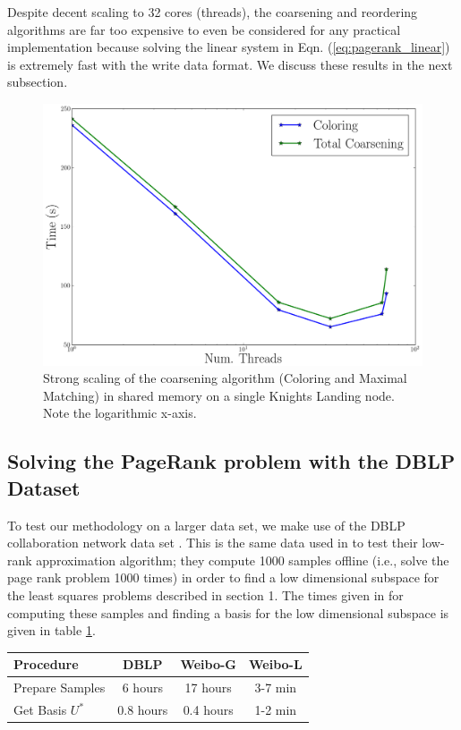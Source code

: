 \documentclass[11pt]{article}
\begin{document}
Despite decent scaling to 32 cores (threads), the coarsening and reordering
algorithms are far
too expensive to even be considered for any practical implementation because
solving the linear system in Eqn. (\ref{eq:pagerank_linear}) is extremely fast
with the write data format. We discuss these results in the next subsection.

\begin{figure}
\centering
\includegraphics[width=.5\linewidth]{figs/color_timing.png}
\caption{Strong scaling of the coarsening algorithm (Coloring and Maximal
Matching) in shared memory on a single Knights Landing node. Note the
logarithmic x-axis.}
\label{fig:color_time}
\end{figure}


\subsection{Solving the PageRank problem with the DBLP Dataset}

To test our methodology on a larger data set, we make use of the DBLP
collaboration network data set \cite{snapnets,dblp}. This is the same data used
in \cite{xie} to test their low-rank approximation algorithm; they compute 1000
samples offline (i.e., solve the page rank problem 1000 times) in order to find a
low dimensional subspace for the least squares problems described in section 1.
The times given in \cite{xie} for
computing these samples and finding a basis for the low dimensional subspace 
is given in table \ref{tab:time}.

\begin{table}[h!]
	\centering 
{}
   \begin{tabular}[h]{|l|c|c|c|}
	   \hline 
	   \textbf{Procedure} & \textbf{DBLP} & \textbf{Weibo-G} &
	   \textbf{Weibo-L} \\
	   \hline
	   Prepare Samples & 6 hours & 17 hours & 3-7 min \\ 
	   Get Basis $U^*$ & 0.8 hours & 0.4 hours & 1-2 min \\
	   \hline
   \end{tabular}
\label{tab:time}
\end{table}
\end{document}
